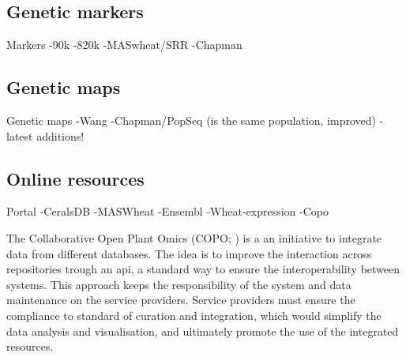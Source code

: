 \subsection{Genetic markers}


Markers
-90k
-820k
-MASwheat/SRR
-Chapman 

\subsection{Genetic maps}
Genetic maps
-Wang \citet{Wang2014} 
-Chapman/PopSeq (is the same population, improved)
-latest additions! \citep{Allen2016,Winfield2016}

\subsection{Online resources}
Portal
-CeralsDB
-MASWheat
-Ensembl
-Wheat-expression
-Copo

The Collaborative Open Plant Omics (COPO; \citealt{Davey2015}) is a an initiative to integrate data from different databases. 
The idea is to improve the interaction across repositories trough an \gls{api}, a standard way to ensure the interoperability between systems. 
This approach keeps the responsibility of the system and data maintenance on the service providers. 
Service providers must ensure the compliance to standard of curation and integration, which would simplify the data analysis and visualisation, and ultimately promote the use of the integrated resources.  










